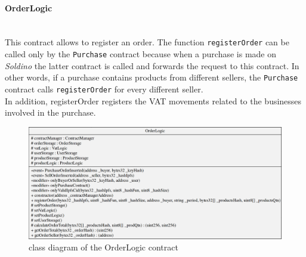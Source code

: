 \paragraph{OrderLogic}\mbox{}\\

\noindent This contract allows to register an order. The function \texttt{registerOrder} can be called only by the \texttt{Purchase} contract because when a purchase is made on \textit{Soldino} the latter contract is called and forwards the request to this contract. In other words, if a purchase contains products from different sellers, the \texttt{Purchase} contract calls \texttt{registerOrder} for every different seller. \\
\textttin In addition, {registerOrder}  registers the VAT movements related to the businesses involved in the purchase.
\begin{figure}[H]
	\centering
	\includegraphics[scale=0.25]{res/images/solidity/orderlogic.png}
	\caption{class diagram of the OrderLogic contract}
\end{figure}